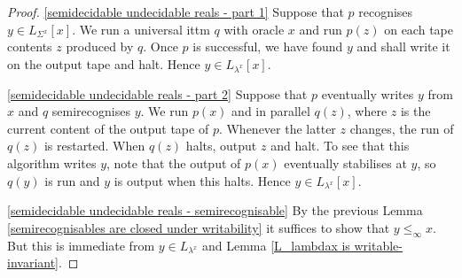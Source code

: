 \documentclass[a4paper,11pt]{amsart}
\theoremstyle{definition}
\newtheorem*{problem A}{Problem 1}
\newtheorem*{problem B}{Problem 2}
\theoremstyle{remark}
\begin{document}
\begin{proof} 
\ref{semidecidable undecidable reals - part 1}
Suppose that $p$ recognises $y\in L_{\Sigma^{x}}[x]$. 
We run a universal ittm $q$ with oracle $x$ and run $p(z)$ on each tape contents $z$ produced by $q$. 
Once $p$ is successful, we have found $y$ and shall write it on the output tape and halt.  Hence  $y\in L_{\lambda^{x}}[x]$.

\ref{semidecidable undecidable reals - part 2}
Suppose that $p$ eventually writes $y$ from $x$ and $q$ semirecognises $y$. 
We run $p(x)$ and in parallel $q(z)$, where $z$ is the current content of the output tape of $p$. 
Whenever the latter $z$ changes, the run of $q(z)$ is restarted. 
When $q(z)$ halts, output $z$ and halt. 
To see that this algorithm writes $y$, note that the output of $p(x)$ eventually stabilises at $y$, so $q(y)$ is run and $y$ is output when this halts. Hence $y\in L_{\lambda^{x}}[x]$.

\ref{semidecidable undecidable reals - semirecognisable} 
By the previous Lemma \ref{semirecognisables are closed under writability} it suffices to show that $y\leq_{\infty}x$. But this is immediate from $y\in L_{\lambda^{x}}$ and Lemma \ref{L_lambdax is writable-invariant}. 


\end{proof}
\end{document}
